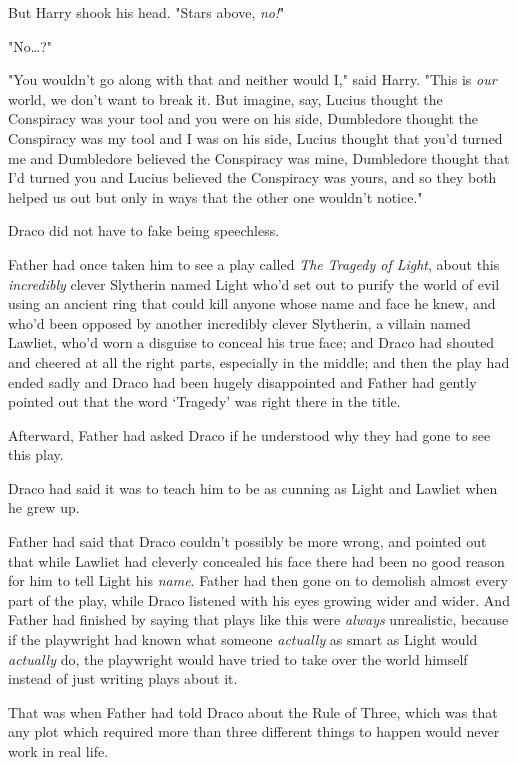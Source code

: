 But Harry shook his head. "Stars above, \emph{no!}"

"No{\ldots}?"

"You wouldn't go along with that and neither would I," said Harry. "This is
\emph{our} world, we don't want to break it. But imagine, say, Lucius thought
the Conspiracy was your tool and you were on his side, Dumbledore thought the
Conspiracy was my tool and I was on his side, Lucius thought that you'd turned
me and Dumbledore believed the Conspiracy was mine, Dumbledore thought that I'd
turned you and Lucius believed the Conspiracy was yours, and so they both
helped us out but only in ways that the other one wouldn't notice."

Draco did not have to fake being speechless.

Father had once taken him to see a play called \emph{The Tragedy of Light},
about this \emph{incredibly} clever Slytherin named Light who'd set out to
purify the world of evil using an ancient ring that could kill anyone whose
name and face he knew, and who'd been opposed by another incredibly clever
Slytherin, a villain named Lawliet, who'd worn a disguise to conceal his true
face; and Draco had shouted and cheered at all the right parts, especially in
the middle; and then the play had ended sadly and Draco had been hugely
disappointed and Father had gently pointed out that the word `Tragedy' was
right there in the title.

Afterward, Father had asked Draco if he understood why they had gone to see
this play.

Draco had said it was to teach him to be as cunning as Light and Lawliet when
he grew up.

Father had said that Draco couldn't possibly be more wrong, and pointed out
that while Lawliet had cleverly concealed his face there had been no good
reason for him to tell Light his \emph{name}. Father had then gone on to
demolish almost every part of the play, while Draco listened with his eyes
growing wider and wider. And Father had finished by saying that plays like this
were \emph{always} unrealistic, because if the playwright had known what
someone \emph{actually} as smart as Light would \emph{actually} do, the
playwright would have tried to take over the world himself instead of just
writing plays about it.

That was when Father had told Draco about the Rule of Three, which was that any
plot which required more than three different things to happen would never work
in real life.

